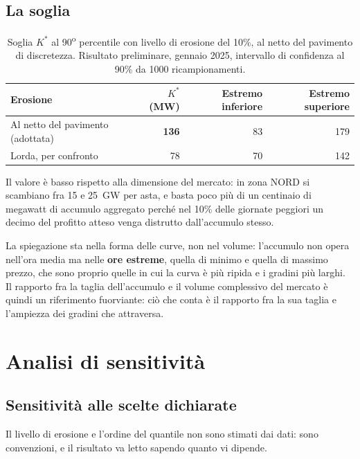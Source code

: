 \subsection{La soglia}

\begin{table}[H]
\centering
\caption{Soglia $K^*$ al 90\textsuperscript{o} percentile con livello di erosione del 10\%,
         al netto del pavimento di discretezza. Risultato preliminare, gennaio 2025,
         intervallo di confidenza al 90\% da 1000 ricampionamenti.}
\label{tab:soglia}
\begin{tabular}{@{}lrrr@{}}
\toprule
\textbf{Erosione} & $K^*$ (MW) & \textbf{Estremo inferiore} & \textbf{Estremo superiore} \\
\midrule
Al netto del pavimento (adottata) & \textbf{136} & 83 & 179 \\
Lorda, per confronto              & 78 & 70 & 142 \\
\bottomrule
\end{tabular}
\end{table}

Il valore \`e basso rispetto alla dimensione del mercato: in zona NORD si scambiano fra 15 e
25~GW per asta, e basta poco pi\`u di un centinaio di megawatt di accumulo aggregato perch\'e
nel 10\% delle giornate peggiori un decimo del profitto atteso venga distrutto dall'accumulo
stesso.

La spiegazione sta nella forma delle curve, non nel volume: l'accumulo non opera nell'ora
media ma nelle \textbf{ore estreme}, quella di minimo e quella di massimo prezzo, che sono
proprio quelle in cui la curva \`e pi\`u ripida e i gradini pi\`u larghi. Il rapporto fra la
taglia dell'accumulo e il volume complessivo del mercato \`e quindi un riferimento fuorviante:
ci\`o che conta \`e il rapporto fra la sua taglia e l'ampiezza dei gradini che attraversa.

\section{Analisi di sensitività}
\label{sec:sensitivita}

\subsection{Sensitivit\`a alle scelte dichiarate}

Il livello di erosione e l'ordine del quantile non sono stimati dai dati: sono convenzioni, e
il risultato va letto sapendo quanto vi dipende.

